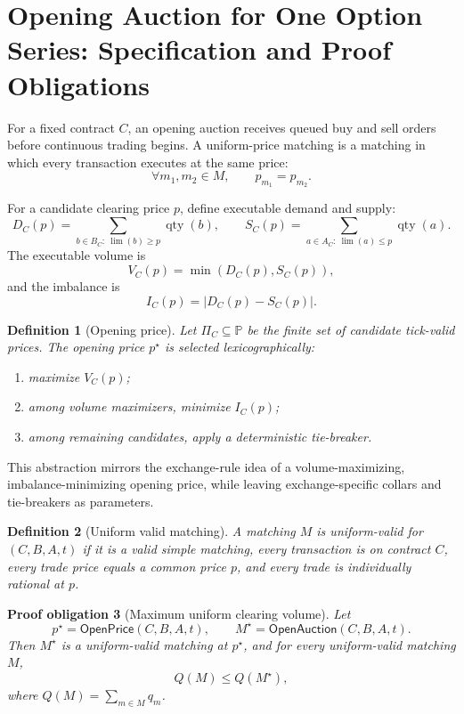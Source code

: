 \documentclass[11pt]{article}
\newtheorem{definition}{Definition}[section]
\newtheorem{proofobligation}[definition]{Proof obligation}
\newcommand{\Price}{\mathbb P}
\newcommand{\limitp}{\operatorname{lim}}
\newcommand{\qty}{\operatorname{qty}}
\begin{document}
\section{Opening Auction for One Option Series: Specification and Proof Obligations}

For a fixed contract \(C\), an opening auction receives queued buy and sell orders before continuous trading begins. A uniform-price matching is a matching in which every transaction executes at the same price:
\[
\forall m_1,m_2\in M,
\qquad p_{m_1}=p_{m_2}.
\]

For a candidate clearing price \(p\), define executable demand and supply:
\[
D_C(p)=\sum_{b\in B_C:\ \limitp(b)\ge p}\qty(b),
\qquad
S_C(p)=\sum_{a\in A_C:\ \limitp(a)\le p}\qty(a).
\]
The executable volume is
\[
V_C(p)=\min(D_C(p),S_C(p)),
\]
and the imbalance is
\[
I_C(p)=|D_C(p)-S_C(p)|.
\]

\begin{definition}[Opening price]
Let \(\Pi_C\subseteq\Price\) be the finite set of candidate tick-valid prices. The opening price \(p^\star\) is selected lexicographically:
\begin{enumerate}[label=(O\arabic*)]
  \item maximize \(V_C(p)\);
  \item among volume maximizers, minimize \(I_C(p)\);
  \item among remaining candidates, apply a deterministic tie-breaker.
\end{enumerate}
\end{definition}

This abstraction mirrors the exchange-rule idea of a volume-maximizing, imbalance-minimizing opening price, while leaving exchange-specific collars and tie-breakers as parameters.

\begin{definition}[Uniform valid matching]
A matching \(M\) is uniform-valid for \((C,B,A,t)\) if it is a valid simple matching, every transaction is on contract \(C\), every trade price equals a common price \(p\), and every trade is individually rational at \(p\).
\end{definition}

\begin{proofobligation}[Maximum uniform clearing volume]
Let
\[
p^\star=\mathsf{OpenPrice}(C,B,A,t),
\qquad
M^\star=\mathsf{OpenAuction}(C,B,A,t).
\]
Then \(M^\star\) is a uniform-valid matching at \(p^\star\), and for every uniform-valid matching \(M\),
\[
Q(M)\le Q(M^\star),
\]
where \(Q(M)=\sum_{m\in M}q_m\).
\end{proofobligation}
\end{document}
